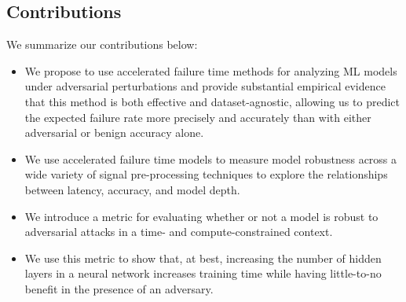 \subsection{Contributions}

We summarize our contributions below:
\begin{itemize}
    \item We propose to use accelerated failure time methods for analyzing ML models under adversarial perturbations and provide substantial empirical evidence that this method is both effective and dataset-agnostic, allowing us to predict the expected failure rate more precisely and accurately than with either adversarial or benign accuracy alone.
    \item We use accelerated failure time models to measure model robustness across a wide variety of signal pre-processing techniques to explore the relationships between latency, accuracy, and model depth.
    \item We introduce a metric for evaluating whether or not a model is robust to adversarial attacks in a time- and compute-constrained context.
    \item We use this metric to show that, at best, increasing the number of hidden layers in a neural network increases training time while having little-to-no benefit in the presence of an adversary.
\end{itemize}
